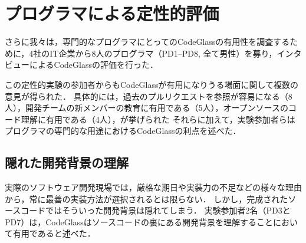 \section{プログラマによる定性的評価}

さらに我々は，専門的なプログラマにとってのCodeGlassの有用性を調査するために，4社のIT企業から8人のプログラマ（PD1--PD8, 全て男性）を募り，インタビューによるCodeGlassの評価を行った．

この定性的実験の参加者からもCodeGlassが有用になりうる場面に関して複数の意見が得られた．
具体的には，過去のプルリクエストを参照が容易になる（8人），開発チームの新メンバーの教育に有用である（5人），オープンソースのコード理解に有用である（4人），が挙げられた
それらに加えて，実験参加者らはプログラマの専門的な用途におけるCodeGlassの利点を述べた．





\subsection*{隠れた開発背景の理解}

実際のソフトウェア開発現場では，厳格な期日や実装力の不足などの様々な理由から，常に最善の実装方法が選択されるとは限らない．
しかし，完成されたソースコードではそういった開発背景は隠れてしまう．
実験参加者2名（PD3とPD7）は，CodeGlassはソースコードの裏にある開発背景を理解することにおいて有用であると述べた．

